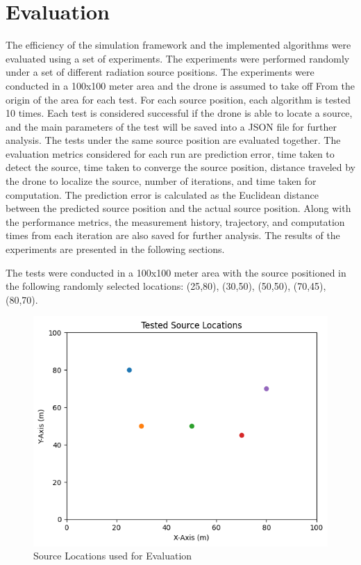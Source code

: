 \documentclass[../report.tex]{subfiles}
\begin{document}
    \section{Evaluation}
    \label{sec:evaluation}

    The efficiency of the simulation framework and the implemented algorithms were evaluated using a set of experiments. The experiments were performed randomly under a 
    set of different radiation source positions. The experiments were conducted in a 100x100 meter area and the drone is assumed to take off From
    the origin of the area for each test. For each source position, each algorithm is tested 10 times. Each test is considered successful if the drone is able to 
    locate a source, and the main parameters of the test will be saved into a JSON file for further analysis.  The tests under the same source position are evaluated
    together. The evaluation metrics considered for each run are prediction error, time taken to detect the source, time taken to converge the source position, 
    distance traveled by the drone to localize the source, number of iterations, and time taken for computation. The prediction error is calculated as the Euclidean
    distance between the predicted source position and the actual source position. Along with the performance metrics, the measurement history, trajectory, and computation times from each 
    iteration are also saved for further analysis. The results of the experiments are presented in the following sections.


    The tests were conducted in a 100x100 meter area with the source positioned in the following randomly selected locations: (25,80), (30,50), (50,50), (70,45), (80,70).
    \begin{figure}[ht]
        \centering
        \includegraphics[width=0.8\linewidth]{figures/source_locations.png}
        \caption{Source Locations used for Evaluation}
        \label{fig:figureexample}
    \end{figure}
\end{document}
